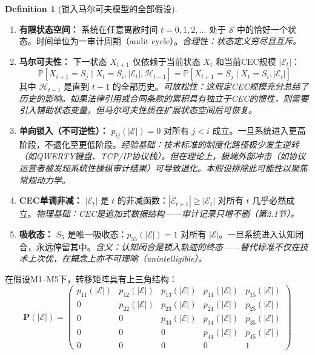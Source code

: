 \documentclass[12pt,a4paper]{ctexart}
\theoremstyle{definition}
\newtheorem{definition}{Definition}[section]
\theoremstyle{remark}
\begin{document}
\begin{definition}[锁入马尔可夫模型的全部假设]
\label{def:markov-assumptions}
\begin{enumerate}[label=\textbf{M\arabic*}, leftmargin=*, itemsep=4pt]
\item \textbf{有限状态空间：} 系统在任意离散时间 $t = 0, 1, 2, \ldots$ 处于 $\mathcal{S}$ 中的恰好一个状态。时间单位为一审计周期（audit cycle）。\hfill\textit{合理性：状态定义穷尽且互斥。}

\item \textbf{马尔可夫性：} 下一状态 $X_{t+1}$ 仅依赖于当前状态 $X_t$ 和当前CEC规模 $|\mathcal{E}_t|$：
\begin{equation}
\mathbb{P}[X_{t+1} = S_j \mid X_t = S_i, |\mathcal{E}_t|, \mathcal{H}_{t-1}] = \mathbb{P}[X_{t+1} = S_j \mid X_t = S_i, |\mathcal{E}_t|]
\end{equation}
其中 $\mathcal{H}_{t-1}$ 是直到 $t-1$ 的全部历史。\hfill\textit{可放松性：这假定CEC规模充分总结了历史的影响。如果法律引用或合同条款的累积具有独立于CEC的惯性，则需要引入辅助状态变量，但马尔可夫性质在扩展状态空间后可恢复。}

\item \textbf{单向锁入（不可逆性）：} $p_{ij}(|\mathcal{E}|) = 0$ 对所有 $j < i$ 成立。一旦系统进入更高阶段，不退化至更低阶段。\hfill\textit{经验基础：技术标准的制度化路径极少发生逆转（如QWERTY键盘、TCP/IP协议栈）。但在理论上，极端外部冲击（如协议运营者被发现系统性操纵审计结果）可导致退化。本假设排除此可能性以聚焦常规动力学。}

\item \textbf{CEC单调非减：} $|\mathcal{E}_t|$ 是 $t$ 的非减函数：$|\mathcal{E}_{t+1}| \geq |\mathcal{E}_t|$ 对所有 $t$ 几乎必然成立。\hfill\textit{物理基础：CEC是追加式数据结构——审计记录只增不删（第2.1节）。}

\item \textbf{吸收态：} $S_5$ 是唯一吸收态：$p_{55}(|\mathcal{E}|) = 1$ 对所有 $|\mathcal{E}|$。一旦系统进入认知闭合，永远停留其中。\hfill\textit{含义：认知闭合是锁入轨迹的终态——替代标准不仅在技术上次优，在概念上亦不可理喻（unintelligible）。}
\end{enumerate}
\end{definition}

在假设M1--M5下，转移矩阵具有上三角结构：
\begin{equation}
\mathbf{P}(|\mathcal{E}|) =
\begin{pmatrix}
p_{11}(|\mathcal{E}|) & p_{12}(|\mathcal{E}|) & p_{13}(|\mathcal{E}|) & p_{14}(|\mathcal{E}|) & p_{15}(|\mathcal{E}|) \\
0 & p_{22}(|\mathcal{E}|) & p_{23}(|\mathcal{E}|) & p_{24}(|\mathcal{E}|) & p_{25}(|\mathcal{E}|) \\
0 & 0 & p_{33}(|\mathcal{E}|) & p_{34}(|\mathcal{E}|) & p_{35}(|\mathcal{E}|) \\
0 & 0 & 0 & p_{44}(|\mathcal{E}|) & p_{45}(|\mathcal{E}|) \\
0 & 0 & 0 & 0 & 1
\end{pmatrix}
\label{eq:transition-matrix}
\end{equation}
\end{document}
